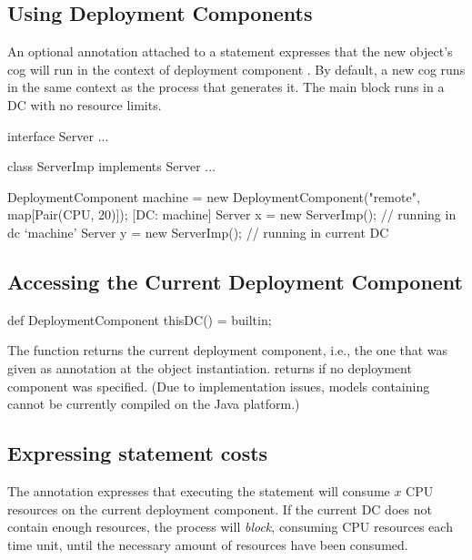\subsection{Using Deployment Components}

   An optional annotation \absinline{[DC: x]} attached to a 
   statement expresses that the new object's cog will run in the context
   of deployment component .  By default, a new cog runs in the
   same context as the process that generates it.  The main block runs
   in a DC with no resource limits.

\begin{absexample} 
interface Server { ... }

class ServerImp implements Server { ... }

{
  DeploymentComponent machine = new DeploymentComponent("remote",
      map[Pair(CPU, 20)]);
  [DC: machine] Server x = new ServerImp();  // running in dc `machine'
  Server y = new ServerImp();                // running in current DC
}
\end{absexample} 

\subsection{Accessing the Current Deployment Component}

\begin{absexample} 
def DeploymentComponent thisDC() = builtin;
\end{absexample} 

   The  function returns the current deployment
   component, i.e., the one that was given as annotation at the 
   object instantiation.   returns  if no
   deployment component was specified.  (Due to implementation issues,
   models containing  cannot be currently compiled on the
   Java platform.)

\subsection{Expressing statement costs}

The annotation  expresses that executing the statement
 will consume $x$ CPU resources on the current deployment
component.  If the current DC does not contain enough resources, the process
will \emph{block}, consuming CPU resources each time unit, until the necessary
amount of resources have been consumed.

